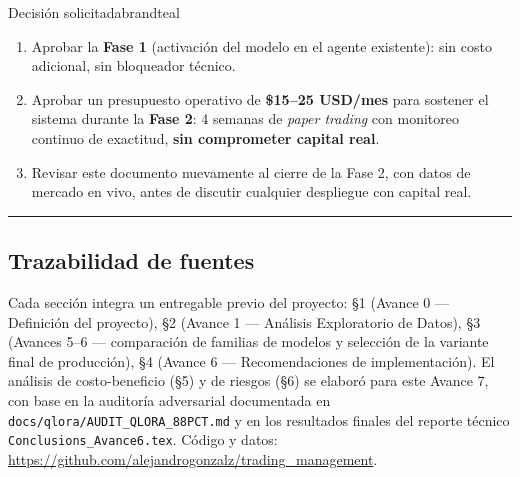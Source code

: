 \documentclass[11pt]{article}
\begin{document}
\begin{calloutbox}{Decisi\'on solicitada}{brandteal}
\begin{enumerate}
\item Aprobar la \textbf{Fase 1} (activaci\'on del modelo en el agente existente): sin costo adicional, sin bloqueador t\'ecnico.
\item Aprobar un presupuesto operativo de \textbf{\$15--25 USD/mes} para sostener el sistema durante la \textbf{Fase 2}: 4 semanas de \textit{paper trading} con monitoreo continuo de exactitud, \textbf{sin comprometer capital real}.
\item Revisar este documento nuevamente al cierre de la Fase 2, con datos de mercado en vivo, antes de discutir cualquier despliegue con capital real.
\end{enumerate}
\end{calloutbox}

\vspace{1.2em}
\hrule
\vspace{0.8em}

\subsection*{\sffamily Trazabilidad de fuentes}
{\footnotesize Cada secci\'on integra un entregable previo del proyecto: \S1 (Avance 0 --- Definici\'on del proyecto), \S2 (Avance 1 --- An\'alisis Exploratorio de Datos), \S3 (Avances 5--6 --- comparaci\'on de familias de modelos y selecci\'on de la variante final de producci\'on), \S4 (Avance 6 --- Recomendaciones de implementaci\'on). El an\'alisis de costo-beneficio (\S5) y de riesgos (\S6) se elabor\'o para este Avance 7, con base en la auditor\'ia adversarial documentada en \texttt{docs/qlora/AUDIT\_QLORA\_88PCT.md} y en los resultados finales del reporte t\'ecnico \texttt{Conclusions\_Avance6.tex}. C\'odigo y datos: \url{https://github.com/alejandrogonzalz/trading_management}.}
\end{document}
